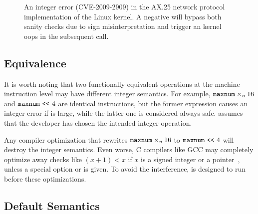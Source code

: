 \begin{figure}
\centering

\vspace{-1em}
\caption{An integer error (CVE-2009-2909) in the AX.25
network protocol implementation of the Linux kernel.  A negative
 will bypass both sanity checks due to sign misinterpretation
 and trigger an kernel
oops in the subsequent  call.}
\label{f:ax25-sign}
\end{figure}

\subsection{Equivalence}
\label{s:sema:eqv}

It is worth noting that two functionally equivalent operations at
the machine instruction level may have different integer semantics.
For example, $\texttt{maxnum}\times_u 16$ and $\texttt{maxnum} \ \texttt{<}\texttt{<}\  4$ are
identical instructions, but the former expression causes an integer
error if  is large, while the latter one is considered
always safe.  \sys assumes that the developer has chosen the
intended integer operation.

Any compiler optimization that rewrites
$\texttt{maxnum}\times_u 16$ to $\texttt{maxnum} \ \texttt{<}\texttt{<}\  4$ will destroy the
integer semantics.  Even worse, C compilers like GCC may completely
optimize away checks like $(x + 1) < x$ if $x$ is a signed integer
or a pointer~\cite{gcc:signed-overflow,us-cert:gcc}, unless a special
option  or  is
given.  To avoid the interference, \sys is designed to run before
these optimizations.

\subsection{Default Semantics}
\label{s:sema:def}

